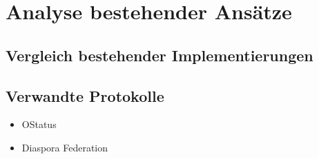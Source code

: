 
\chapter{Analyse bestehender Ansätze}
\label{ch:analysis_given_approachs}

\section{Vergleich bestehender Implementierungen}
\section{Verwandte Protokolle}
	\begin{itemize}
		\item OStatus
		\item Diaspora Federation
	\end{itemize}